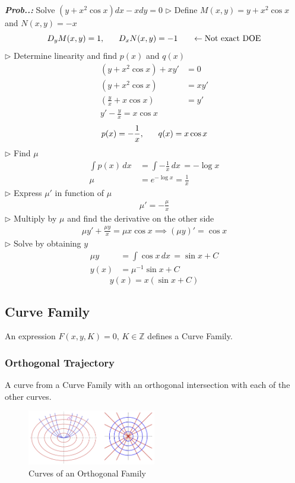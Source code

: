 \documentclass[a4paper]{article}
\begin{document}
\vspace{2ex}\textbf{\textit{Prob.\thesection.\theprob: }}Solve $(y+x^{2}\cos x)dx-xdy=0$ 
$\triangleright$ Define $M(x,y)=y+x^{2}\cos x$ and $N(x,y)=-x$
$$
D_{y}M(x,y)=1,\hspace{4ex}D_{x}N(x,y)=-1 \hspace{4ex}\leftarrow\text{Not exact DOE}
$$
$\triangleright$ Determine linearity and find $p(x)$ and $q(x)$
\begin{align}
(y+x^{2}\cos x)+xy'&=0 \\
(y+x^{2}\cos x)&=xy' \\
\left( \frac{y}{x}+x\cos x \right)&=y' \\
y'-\frac{y}{x}=x\cos x
\end{align}
$$
p(x)=-\frac{1}{x},\hspace{4ex}q(x)=x\cos x
$$
$\triangleright$ Find $\mu$
\begin{align}
\int p(x) \, dx\, &=\int -\frac{1}{x} \, dx\, =-\log x \\
\mu&=e^{ -\log x }=\frac{1}{x}
\end{align}
$\triangleright$ Express $\mu'$ in function of $\mu$
\begin{align}
\mu'=-\frac{\mu}{x}
\end{align}
$\triangleright$ Multiply by $\mu$ and find the derivative on the other side
\begin{align}
\mu y'+\frac{\mu y}{x}=\mu x\cos x \implies (\mu y)'=\cos x
\end{align}
$\triangleright$ Solve by obtaining $y$
\begin{align}
\mu y&=\int \cos x \, dx\, =\sin x+C  \\
y(x)&=\mu^{-1}\sin x+C
\end{align}
$$
\boxed{y(x)=x(\sin x+C)}
$$

\subsection{Curve Family}
\setcounter{equation}{0}

An expression $F(x,y,K)=0,\,K\in\mathbb{Z}$ defines a Curve Family.

\subsubsection{Orthogonal Trajectory}
A curve from a Curve Family with an orthogonal intersection with each of the other curves.

\begin{figure}[H]
    \centering
    \includegraphics[width=0.5\textwidth]{IMG/ortho_fam.png}
    \caption{Curves of an Orthogonal Family}
    \label{fig:ortho_fam}
\end{figure}
\end{document}
